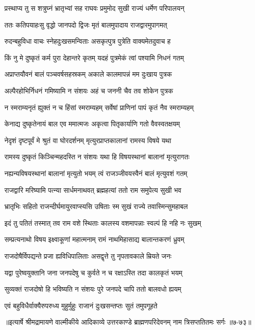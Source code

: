 
\twolineshloka
{प्रस्थाप्य तु स शत्रुघ्नं भ्रातृभ्यां सह राघवः}
{प्रमुमोद सुखी राज्यं धर्मेण परिपालयन्} %

\twolineshloka
{ततः कतिपयाहःसु वृद्धो जानपदो द्विजः}
{मृतं बालमुपादाय राजद्वारमुपागमत्} %

\twolineshloka
{रुदन्बहुविधा वाचः स्नेहदुःखसमन्विताः}
{असकृत्पुत्र पुत्रेति वाक्यमेतदुवाच ह} %

\twolineshloka
{किं नु मे दुष्कृतं कर्म पुरा देहान्तरे कृतम्}
{यदहं पुत्रमेकं त्वां पश्यामि निधनं गतम्} %

\twolineshloka
{अप्राप्तयौवनं बालं पञ्चवर्षसहस्रकम्}
{अकाले कालमापन्नं मम दुःखाय पुत्रक} %

\twolineshloka
{अल्पैरहोभिर्निधनं गमिष्यामि न संशयः}
{अहं च जननी चैव तव शोकेन पुत्रक} %

\twolineshloka
{न स्मराम्यनृतं ह्युक्तं न च हिंसां स्मराम्यहम्}
{सर्वेषां प्राणिनां पापं कृतं नैव स्मराम्यहम्} %

\twolineshloka
{केनाद्य दुष्कृतेनायं बाल एव ममात्मजः}
{अकृत्वा पितृकार्याणि गतो वैवस्वतक्षयम्} %

\twolineshloka
{नेदृशं दृष्टपूर्वं मे श्रुतं वा घोरदर्शनम्}
{मृत्युरप्राप्तकालानां रामस्य विषये यथा} %

\twolineshloka
{रामस्य दुष्कृतं किञ्चिन्महदस्ति न संशयः}
{यथा हि विषयस्थानां बालानां मृत्युरागतः} %

\twolineshloka
{नह्यन्यविषयस्थानां बालानां मृत्युतो भयम्}
{त्वं राजञ्जीवयस्वैनं बालं मृत्युवशं गतम्} %

\twolineshloka
{राजद्वारि मरिष्यामि पत्न्या सार्धमनाथवत्}
{ब्रह्महत्यां ततो राम समुपेत्य सुखी भव} %

\twolineshloka
{भ्रातृभिः सहितो राजन्दीर्घमायुरवाप्स्यसि}
{उषिताः स्म सुखं राज्ये तवास्मिन्सुमहाबल} %

\twolineshloka
{इदं तु पतितं तस्मात् तव राम वशे स्थिताः}
{कालस्य वशमापन्नाः स्वल्पं हि नहि नः सुखम्} %

\twolineshloka
{सम्प्रत्यनाथो विषय इक्ष्वाकूणां महात्मनाम्}
{रामं नाथमिहासाद्य बालान्तकरणं ध्रुवम्} %

\twolineshloka
{राजदोषैर्विपद्यन्ते प्रजा ह्यविधिपालिताः}
{असद्वृत्ते तु नृपतावकाले म्रियते जनः} %

\twolineshloka
{यद्वा पुरेष्वयुक्तानि जना जनपदेषु च}
{कुर्वते न च रक्षाऽस्ति तदा कालकृतं भयम्} %

\twolineshloka
{सुव्यक्तं राजदोषो हि भविष्यति न संशयः}
{पुरे जनपदे चापि ततो बालवधो ह्ययम्} %

\twolineshloka
{एवं बहुविधैर्वाक्यैरुपरुध्य मुहुर्मुहुः}
{राजानं दुःखसन्तप्तः सुतं तमुपगूहते} %


॥इत्यार्षे श्रीमद्रामायणे वाल्मीकीये आदिकाव्ये उत्तरकाण्डे ब्राह्मणपरिदेवनम् नाम त्रिसप्ततितमः सर्गः ॥७-७३॥
